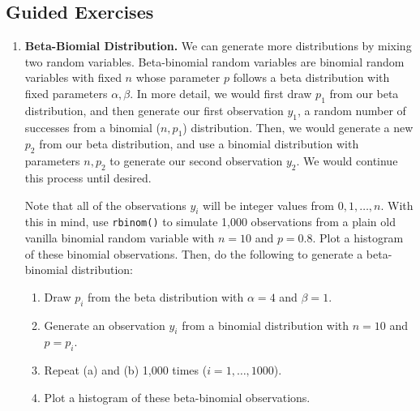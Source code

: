 \documentclass[
]{krantz}
\providecommand{\tightlist}{%
  \setlength{\itemsep}{0pt}\setlength{\parskip}{0pt}}
\begin{document}
\hypertarget{guided-exercises-2}{%
\subsection{Guided Exercises}\label{guided-exercises-2}}

\begin{enumerate}
\def\labelenumi{\arabic{enumi}.}
\item
  \textbf{Beta-Biomial Distribution.} We can generate more distributions by mixing two random variables.  Beta-binomial random variables are binomial random variables with fixed \(n\) whose parameter \(p\) follows a beta distribution with fixed parameters \(\alpha, \beta\). In more detail, we would first draw \(p_1\) from our beta distribution, and then generate our first observation \(y_1\), a random number of successes from a binomial (\(n, p_1\)) distribution. Then, we would generate a new \(p_2\) from our beta distribution, and use a binomial distribution with parameters \(n, p_2\) to generate our second observation \(y_2\). We would continue this process until desired.

  Note that all of the observations \(y_i\) will be integer values from \(0, 1, \ldots, n\). With this in mind, use \texttt{rbinom()} to simulate 1,000 observations from a plain old vanilla binomial random variable with \(n=10\) and \(p=0.8\). Plot a histogram of these binomial observations. Then, do the following to generate a beta-binomial distribution:

  \begin{enumerate}
  \def\labelenumii{\alph{enumii}.}
  \tightlist
  \item
    Draw \(p_i\) from the beta distribution with \(\alpha=4\) and \(\beta=1\).
  \item
    Generate an observation \(y_i\) from a binomial distribution with \(n=10\) and \(p = p_i\).
  \item
    Repeat (a) and (b) 1,000 times (\(i=1,\ldots,1000\)).
  \item
    Plot a histogram of these beta-binomial observations.
  \end{enumerate}


\end{enumerate}
\end{document}
